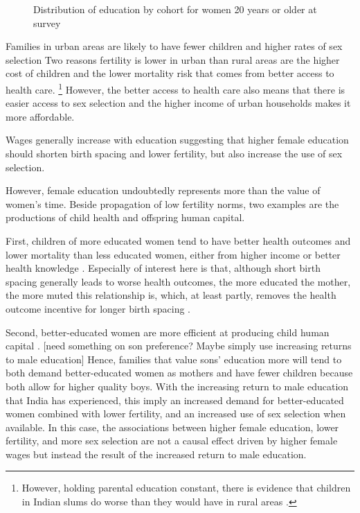 \begin{figure}[htpb]
\centering
{} 
\caption{Distribution of education by cohort for women 20 years or older at survey}
\label{fig:education_over_time}
\end{figure}


Families in urban areas are likely to have fewer children and higher rates of sex 
selection 
Two reasons fertility is lower in urban than rural areas are the higher cost of 
children and the lower mortality risk that comes from better access to health care.%
\footnote{
However, holding parental education constant, there is evidence that children in
Indian slums do worse than they would have in rural areas \citep{Portner2018a}.
}
However, the better access to health care also means that there is easier access to
sex selection and the higher income of urban households makes it more affordable.


Wages generally increase with education suggesting that higher female education
should shorten birth spacing and lower fertility, but also increase the use of sex 
selection.



However, female education undoubtedly represents more than the value of women's time.
Beside propagation of low fertility norms, two examples are the productions of child 
health and offspring human capital.

First, children of more educated women tend to have better health outcomes and lower 
mortality than less educated women, either from higher income or better health knowledge 
\citep{Rosenzweig1982a,Kovsted2002,Whitworth2002,Maitra2008}.
Especially of interest here is that, although short birth spacing generally leads to worse 
health outcomes, the more educated the mother, the more muted this relationship is, which, 
at least partly, removes the health outcome incentive for longer birth spacing
\citep{Molitoris2019}.

Second, better-educated women are more efficient at producing child human capital 
\citep{Behrman1999}.
[need something on son preference? Maybe simply use increasing returns to male education]
Hence, families that value sons' education more will tend to both demand better-educated
women as mothers and have fewer children because both allow for higher quality boys.
With the increasing return to male education that India has experienced, this imply
an increased demand for better-educated women combined with lower fertility, and an 
increased use of sex selection when available.
In this case, the associations between higher female education, lower fertility, and more
sex selection are not a causal effect driven by higher female wages but instead the result 
of the increased return to male education. 

